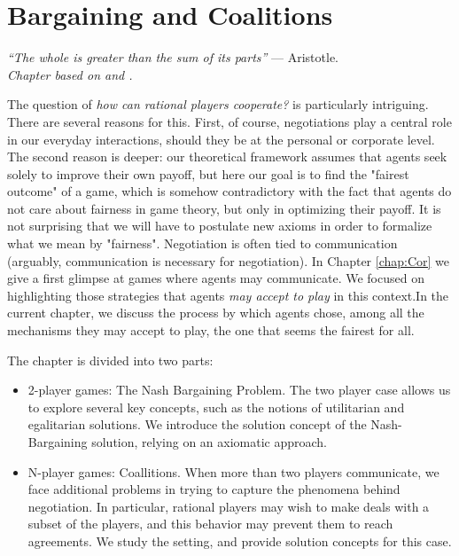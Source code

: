 

\ifx \globalmark \undefined %
	
\else
\fi




\chapter{Bargaining and Coalitions}
{\large{\itshape
``The whole is greater than the sum of its parts''} --- Aristotle.\\
}
\label{chap:Bar}
{\small{\itshape
Chapter based on \cite[pages 370 - 390 and 417 - 444]{MyGTAO} and \cite[Chapter 12]{ShLeMSAG}.}\\
}


The question of \emph{how can rational players cooperate?} is particularly intriguing. There are several reasons for this. First, of course, negotiations play a central role in our everyday interactions, should they be at the personal or corporate level. The second reason is deeper: our theoretical framework assumes that agents seek solely to improve their own payoff, but here our goal is to find the "fairest outcome" of a game, which is somehow contradictory with the fact that agents do not care about fairness in game theory, but only in optimizing their payoff.  It is not surprising that we will have to postulate new axioms in order to formalize what we mean by "fairness".
Negotiation is often tied to communication (arguably, communication is necessary for negotiation). In Chapter \ref{chap:Cor} we give a first glimpse at games where agents may communicate. We focused on highlighting those strategies that agents \emph{may accept to play} in this context.In the current chapter, we discuss the process by which agents chose, among all the mechanisms they may accept to play, the one that seems the fairest for all.

The chapter is divided into two parts:
\begin{itemize}
\item 2-player games: The Nash Bargaining Problem. The two player case allows us to explore several key concepts, such as the notions of utilitarian and egalitarian solutions. We introduce the solution concept of the Nash-Bargaining solution, relying on an axiomatic approach.
\item N-player games: Coallitions. When more than two players communicate, we face additional problems in trying to capture the phenomena behind negotiation. In particular, rational players may wish to make deals with a subset of the players, and this behavior may prevent them to reach agreements. We study the setting, and provide solution concepts for this case.
\end{itemize}




